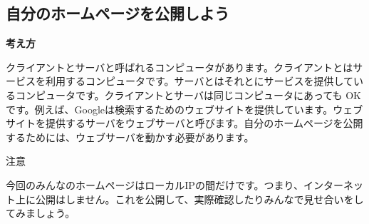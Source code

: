 
%
%
\subsection{自分のホームページを公開しよう\label{E:myHP}}
{\bfseries 考え方}


クライアントとサーバと呼ばれるコンピュータがあります。クライアントとはサービスを利用するコンピュータです。サーバとはそれとにサービスを提供しているコンピュータです。クライアントとサーバは同じコンピュータにあっても
OK です。例えば、Googleは検索するためのウェブサイトを提供しています。ウェブサイトを提供するサーバをウェブサーバと呼びます。自分のホームページを公開するためには、ウェブサーバを動かす必要があります。

注意

今回のみんなのホームページはローカルIPの間だけです。つまり、インターネット上に公開はしません。これを公開して、実際確認したりみんなで見せ合いをしてみましょう。


\bigskip

